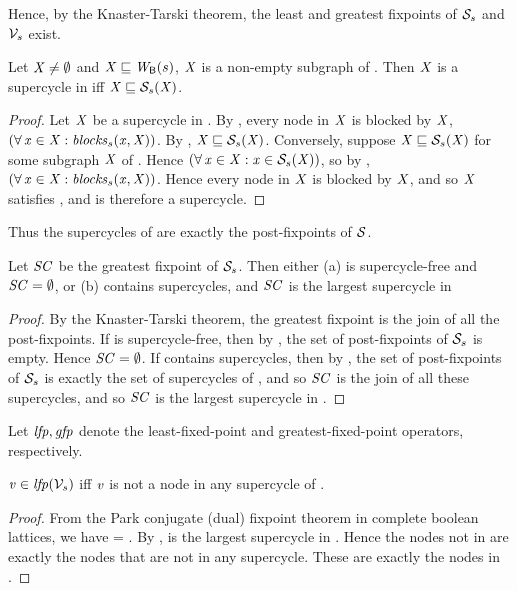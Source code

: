 Hence, by the Knaster-Tarski theorem, the least and greatest fixpoints of $\mathcal{S}_s$ and $\mathcal{V}_s$ exist.

\begin{proposition} \label{prop:supercycleGFP}
Let $\mathit{X} \ne \emptyset$ and $\mathit{X} \sqsubseteq \mathit{W}_{\mathsf{B}}({s})$, \ie $\mathit{X}$ is a non-empty subgraph of . Then $\mathit{X}$ is a supercycle in  iff $\mathit{X} \sqsubseteq \mathcal{S}_{s}(\mathit{X})$.
\end{proposition}
%
\begin{proof}
Let $\mathit{X}$ be a supercycle in . By , every node in $\mathit{X}$ is blocked by $\mathit{X}$, \ie 
$(\forall\, \mathit{x} \in \mathit{X}: \mathit{blocks}_{s}(\mathit{x}, \mathit{X}))$. By , $\mathit{X} \sqsubseteq \mathcal{S}_{s}(\mathit{X})$.
%
Conversely, suppose $\mathit{X} \sqsubseteq \mathcal{S}_{s}(\mathit{X})$ for some subgraph $\mathit{X}$ of . Hence 
$(\forall\, \mathit{x} \in \mathit{X}: \mathit{x} \in \mathcal{S}_{s}(\mathit{X}))$, so by , $(\forall\, \mathit{x} \in \mathit{X}: \mathit{blocks}_{s}(\mathit{x}, \mathit{X}))$.
Hence every node in $\mathit{X}$ is blocked by $\mathit{X}$, and so $\mathit{X}$ satisfies , and is therefore a supercycle.
\end{proof}
%
Thus the supercycles of  are exactly the post-fixpoints of $\mathcal{S}$. %

\begin{proposition} \label{prop:GFPisLargestSC}
Let $\mathit{SC}$ be the greatest fixpoint of $\mathcal{S}_s$. Then either
(a)  is supercycle-free and $\mathit{SC} = \emptyset$, or 
(b)  contains supercycles, and $\mathit{SC}$ is the largest supercycle in 
\end{proposition}
%
\begin{proof}
By the Knaster-Tarski theorem, the greatest fixpoint is the join of all the post-fixpoints. 
If  is supercycle-free, then by , the set of post-fixpoints of $\mathcal{S}_s$ is empty. 
Hence $\mathit{SC} = \emptyset$.
If  contains supercycles, then by ,  the set of post-fixpoints of $\mathcal{S}_s$ is exactly the set of 
supercycles of , and so $\mathit{SC}$ is the join of all these supercycles, and so $\mathit{SC}$ is the largest supercycle in .
\end{proof}

Let $\mathit{lfp}, \mathit{gfp}$ denote the least-fixed-point and greatest-fixed-point operators, respectively.

\begin{proposition}  \label{prop:LFPisScViolations}
$\mathit{v} \in  \mathit{lfp}(\mathcal{V}_s)$ iff $\mathit{v}$ is not a node in any supercycle of .    
\end{proposition}
%
\begin{proof}
From the Park conjugate (dual) fixpoint theorem in complete boolean lattices, we have 
 = .
By ,  is the largest supercycle in . Hence the nodes not in 
 are exactly the nodes that are not in any supercycle. These are exactly the nodes in .
\end{proof}

